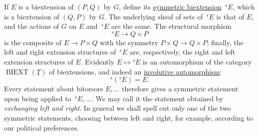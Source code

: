 If $E$ is a biextension of $(P,Q)$ by $G$, define its
\underline{symmetric biextension} $\,{}^{s}E$, which is a biextension
of $(Q,P)$ by $G$. The underlying sheaf of sets of $\,{}^{s}E$ is that
of $E$, and the actions of $G$ on $E$ and $\,{}^{s}E$ are the same.
The structural morphism
\[
 {}^{s}E\longrightarrow Q\times P
\]
is the composite of $E\longrightarrow P\times Q$ with the symmetry
$P\times Q\longrightarrow Q\times P$; finally, the left and right
extension structures of $\,{}^{s}E$ are, respectively, the right and
left extension structures of $E$. Evidently $E\mapsto{}^{s}E$ is an
automorphism of the category $\operatorname{BIEXT}(\underline T)$ of
biextensions, and indeed an \underline{involutive automorphism}:
\[
 {}^{s}({}^{s}E)=E.
\]
Every statement about bitorsors $E,\ldots$ therefore gives a symmetric
statement upon being applied to $\,{}^{s}E,\ldots$. We may call it the
statement obtained by \emph{exchanging left and right}. In general we
shall spell out only one of the two symmetric statements, choosing
between left and right, for example, according to our political
preferences.

